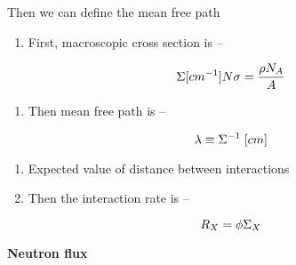 \documentclass[aspectratio=1610,pdftex,dvipsnames,compress,xcolor={dvipsnames}]{beamer}
\begin{document}
\begin{frame}{Then we can define the mean free path}
    \begin{enumerate}[series=outerlist,topsep=0pt,itemsep=21pt,leftmargin=*,label=(\arabic*)]
        \item[]First, macroscopic cross section is --
    \end{enumerate}

    \vspace*{\fill}

    \begin{equation}
        \LARGE
        \Sigma [cm^{-1}] N \sigma = \frac{\rho N_A}{A}
    \end{equation}

    \vspace*{\fill}

    \begin{enumerate}[series=outerlist,topsep=0pt,itemsep=21pt,leftmargin=*,label=(\arabic*)]
        \item[]Then mean free path is --
    \end{enumerate}

    \vspace*{\fill}

    \begin{equation}
        \LARGE
        \lambda \equiv \Sigma^{-1} \; [cm]
    \end{equation}

    \vspace*{\fill}

    \begin{enumerate}[series=outerlist,topsep=0pt,itemsep=11pt,leftmargin=*,label=(\arabic*)]
        \item[]Expected value of distance between interactions
        \item[]Then the interaction rate is --
    \end{enumerate}

    \vspace*{\fill}

    \begin{equation}
        \LARGE
        R_X = \phi \Sigma_X
    \end{equation}

\end{frame}


\begin{frame}[plain]{}
    \centering\LARGE\textbf{Neutron flux}
\end{frame}
\end{document}
